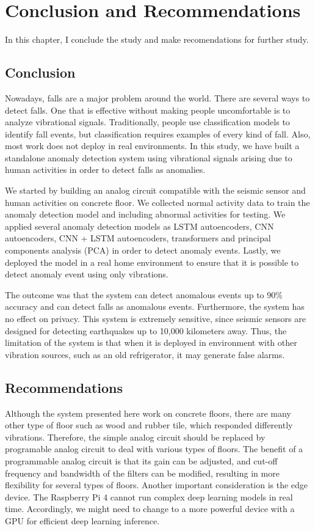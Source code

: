 \setlength{\parindent}{0in}
\setlength{\parskip}{1em}
\setlength{\baselineskip}{1.6em}

\chapter{Conclusion and Recommendations}
\label{ch:conclusion}
In this chapter, I conclude the study and make recomendations for further study.
\section{Conclusion}

Nowadays, falls are a major problem around the world. There are several ways to detect falls. One that is effective without making people uncomfortable is to analyze vibrational signals. Traditionally, people use classification models to identify fall events, but classification requires examples of every kind of fall. Also, most work does not deploy in real environments. In this study, we have built a standalone anomaly detection system using vibrational signals arising due to human activities in order to detect falls as anomalies.

We started by building an analog circuit compatible with the seismic sensor and human activities on concrete floor. We collected normal activity data to train the anomaly detection model and including abnormal activities for testing. We applied several anomaly detection models as LSTM autoencoders, CNN autoencoders, CNN + LSTM autoencoders, transformers and principal components analysis (PCA) in order to detect anomaly events. Lastly, we deployed the model in a real home environment to ensure that it is possible to detect anomaly event using only vibrations.

The outcome was that the system can detect anomalous events up to 90$\%$ accuracy and can detect falls as anomalous events. Furthermore, the system has no effect on privacy. This system is extremely sensitive, since seismic sensors are designed for detecting earthquakes up to 10,000 kilometers away. Thus, the limitation of the system is that when it is deployed in environment with other vibration sources, such as an old refrigerator, it may generate false alarms.

\section{Recommendations}
Although the system presented here work on concrete floors, there are many other type of floor such as wood and rubber tile, which responded differently vibrations. Therefore, the simple analog circuit should be replaced by programable analog circuit to deal with various types of floors. The benefit of a programmable analog circuit is that its gain can be adjusted, and cut-off frequency and bandwidth of the filters can be modified, resulting in more flexibility for several types of floors. Another important consideration is the edge device. The Raspberry Pi 4 cannot run complex deep learning models in real time. Accordingly, we might need to change to a more powerful device with a GPU for efficient deep learning inference.

\FloatBarrier

